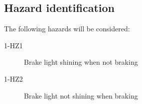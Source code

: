 \subsection{Hazard identification}
%
The following hazards will be considered:
\begin{description}
\item [1-HZ1] Brake light shining when not braking
\item [1-HZ2] Brake light not shining when braking
\end{description}


